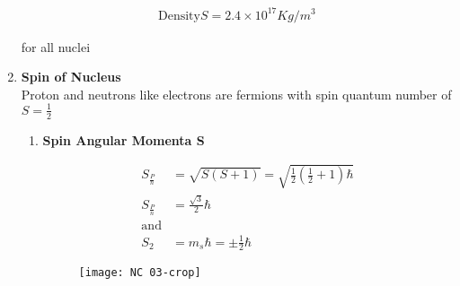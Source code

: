 \begin{enumerate}
\begin{center}
{{			\addvspace{-0.5cm} \centering
			
			\begin{align*}
			\text{Density}S=2.4\times10^{17}Kg/m^3
			\end{align*}} }
\end{center}
for all nuclei\\
\item \textbf{Spin of Nucleus}\\
Proton and neutrons like electrons are fermions with spin quantum number of $S=\frac{1}{2}$
\begin{enumerate}
	\item \textbf{Spin Angular Momenta S}
\begin{minipage}{0.45\textwidth}
	\begin{align*}
	S_\frac{P}{n}&=\sqrt{S(S+1)}=\sqrt{\frac{1}{2}\left(\frac{1}{2} +1\right) \hbar}\\
	S_\frac{P}{n}&=\frac{\sqrt{3}}{2}\hbar\\
	\text{and}\\
	S_2&=m_s\hbar=\pm\frac{1}{2}\hbar
	\end{align*}
\end{minipage}
\begin{minipage}{0.30\textwidth}
	\begin{figure}[H]
		\centering
		\texttt{[image: NC 03-crop]}
		\caption{}
		\label{Decreasing Function}
	\end{figure}
\end{minipage}


\end{enumerate}
\end{enumerate}
